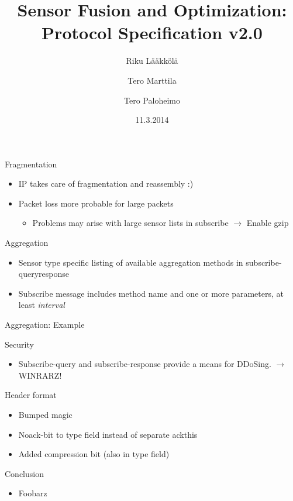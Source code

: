 \documentclass{beamer}
\title[SFO protocol]{Sensor Fusion and Optimization: Protocol Specification v2.0}
\author{Riku Lääkkölä \and Tero Marttila \and Tero Paloheimo}
\institute{Aalto ELEC}
\date{11.3.2014}
\begin{document}
\begin{frame}
\titlepage
\end{frame}

\begin{frame}{Fragmentation}
\begin{itemize}
\item IP takes care of fragmentation and reassembly :)
\item Packet loss more probable for large packets
\begin{itemize}
\item Problems may arise with large sensor lists in subscribe $\rightarrow$ Enable gzip
\end{itemize}
\end{itemize}
\end{frame}

\begin{frame}{Aggregation}
\begin{itemize}
\item Sensor type specific listing of available aggregation methods in subscribe-queryresponse
\item Subscribe message includes method name and one or more parameters, at least \emph{interval}
\end{itemize}
\end{frame}

\begin{frame}{Aggregation: Example}
\end{frame}

\begin{frame}{Security}
\begin{itemize}
  \item Subscribe-query and subscribe-response provide a means for DDoSing. 
  $\rightarrow$ WINRARZ!
\end{itemize}
\end{frame}

\begin{frame}{Header format}
\begin{itemize}
\item Bumped magic
\item Noack-bit to type field instead of separate ackthis
\item Added compression bit (also in type field)
\end{itemize}
\end{frame}

\begin{frame}{Conclusion}
\begin{itemize}
\item Foobarz
\end{itemize}
\end{frame}
\end{document}
